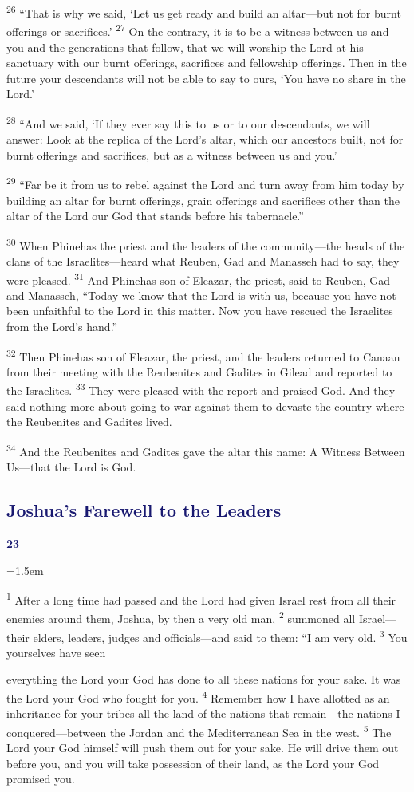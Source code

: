 \documentclass[12pt,twoside]{article}
\newcommand{\vs}[1]{\textsuperscript{#1}}
\newcommand{\chapterWithBigIndent}[2]{%
  \noindent
  \begin{minipage}[t]{1cm}
    \vspace{-0.4\baselineskip}
    {\textcolor{MidnightBlue}{\fontsize{40pt}{48pt}\selectfont \textbf{#1}}}
  \end{minipage}%
  \hspace{0.9cm}%
  \begin{minipage}[t]{\dimexpr\linewidth - 1.5cm - 0.3cm\relax}
    \hangindent=1.5em
    \hangafter=3
    #2
    \vspace{0.05cm}
  \end{minipage}
}
\begin{document}
\vs{26} ``That is why we said, `Let us get ready and build an altar---but not for burnt offerings or sacrifices.'
\vs{27} On the contrary, it is to be a witness between us and you and the generations that follow, that we will worship the Lord at his sanctuary with our burnt offerings, sacrifices and fellowship offerings. Then in the future your descendants will not be able to say to ours, `You have no share in the Lord.'

\vs{28} ``And we said, `If they ever say this to us or to our descendants, we will answer: Look at the replica of the Lord's altar, which our ancestors built, not for burnt offerings and sacrifices, but as a witness between us and you.'

\vs{29} ``Far be it from us to rebel against the Lord and turn away from him today by building an altar for burnt offerings, grain offerings and sacrifices other than the altar of the Lord our God that stands before his tabernacle.''

\vs{30} When Phinehas the priest and the leaders of the community---the heads of the clans of the Israelites---heard what Reuben, Gad and Manasseh had to say, they were pleased.
\vs{31} And Phinehas son of Eleazar, the priest, said to Reuben, Gad and Manasseh, ``Today we know that the Lord is with us, because you have not been unfaithful to the Lord in this matter. Now you have rescued the Israelites from the Lord's hand.''

\vs{32} Then Phinehas son of Eleazar, the priest, and the leaders returned to Canaan from their meeting with the Reubenites and Gadites in Gilead and reported to the Israelites.
\vs{33} They were pleased with the report and praised God. And they said nothing more about going to war against them to devaste the country where the Reubenites and Gadites lived.

\vs{34} And the Reubenites and Gadites gave the altar this name: A Witness Between Us---that the Lord is God.

\subsection*{\textcolor{MidnightBlue}{\textbf{Joshua's Farewell to the Leaders}}}

\chapterWithBigIndent{23}{
  \vs{1} After a long time had passed and the Lord had given Israel rest from all their enemies around them, Joshua, by then a very old man,
  \vs{2} summoned all Israel---their elders, leaders, judges and officials---and said to them: ``I am very old.
  \vs{3} You yourselves have seen
}
\noindent everything the Lord your God has done to all these nations for your sake. It was the Lord your God who fought for you.
\vs{4} Remember how I have allotted as an inheritance for your tribes all the land of the nations that remain---the nations I conquered---between the Jordan and the Mediterranean Sea in the west.
\vs{5} The Lord your God himself will push them out for your sake. He will drive them out before you, and you will take possession of their land, as the Lord your God promised you.
\end{document}
